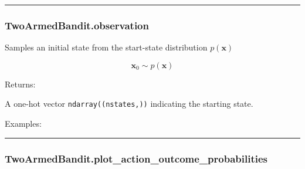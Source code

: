 \begin{center}\rule{0.5\linewidth}{\linethickness}\end{center}

\subsubsection{TwoArmedBandit.observation}\label{twoarmedbandit.observation}

\begin{Shaded}
\begin{Highlighting}[]
\NormalTok{)}
\end{Highlighting}
\end{Shaded}

Samples an initial state from the start-state distribution
\(p(\mathbf x)\)

\[
\mathbf x_0 \sim p(\mathbf x)
\]

Returns:

A one-hot vector \texttt{ndarray((nstates,))} indicating the starting
state.

Examples:

\begin{Shaded}
\begin{Highlighting}[]
\OperatorTok{=}
\end{Highlighting}
\end{Shaded}

\begin{center}\rule{0.5\linewidth}{\linethickness}\end{center}

\subsubsection{TwoArmedBandit.plot\_action\_outcome\_probabilities}\label{twoarmedbandit.plot_action_outcome_probabilities}

\begin{Shaded}
\begin{Highlighting}[]
\OperatorTok{=}\OperatorTok{=}\OperatorTok{=}\OperatorTok{=}\NormalTok{)}
\end{Highlighting}
\end{Shaded}

